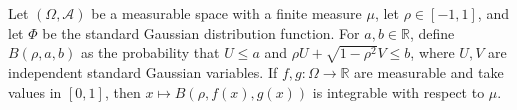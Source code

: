 \begin{lemma}
\label{BooleanAnalysis.GaussianSpace.integrable_gaussianBivariateStability_comp}
\leanok
{}
Let $(\Omega,\mathcal A)$ be a measurable space with a finite measure $\mu$, let
$\rho\in[-1,1]$, and let $\Phi$ be the standard Gaussian distribution function. For
$a,b\in\mathbb R$, define $B(\rho,a,b)$ as the probability that $U\le a$ and $\rho
U+\sqrt{1-\rho^2}V\le b$, where $U,V$ are independent standard Gaussian variables. If
$f,g:\Omega\to\mathbb R$ are measurable and take values in $[0,1]$, then $x\mapsto
B(\rho,f(x),g(x))$ is integrable with respect to $\mu$.
\end{lemma}
